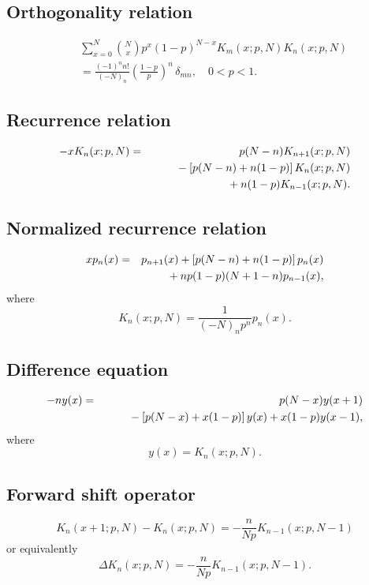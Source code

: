 \documentclass[envcountchap,graybox]{svmono}
\newcommand{\mathindent}{\hspace{7.5mm}}
\begin{document}
\subsection*{Orthogonality relation}
\begin{eqnarray}
\label{OrtKrawtchouk}
& &\sum_{x=0}^N\binom{N}{x}p^x(1-p)^{N-x} K_m(x;p,N)K_n(x;p,N)\nonumber\\
& &{}=\frac{(-1)^nn!}{(-N)_n}\left(\frac{1-p}{p}\right)^n\,\delta_{mn},\quad0 < p < 1.
\end{eqnarray}

\subsection*{Recurrence relation}
\begin{eqnarray}
\label{RecKrawtchouk}
-xK_n(x;p,N)&=&p(N-n)K_{n+1}(x;p,N)\nonumber\\
& &{}\mathindent{}-\left[p(N-n)+n(1-p)\right]K_n(x;p,N)\nonumber\\
& &{}\mathindent\mathindent{}+n(1-p)K_{n-1}(x;p,N).
\end{eqnarray}

\subsection*{Normalized recurrence relation}
\begin{eqnarray}
\label{NormRecKrawtchouk}
xp_n(x)&=&p_{n+1}(x)+\left[p(N-n)+n(1-p)\right]p_n(x)\nonumber\\
& &{}\mathindent{}+np(1-p)(N+1-n)p_{n-1}(x),
\end{eqnarray}
where
$$K_n(x;p,N)=\frac{1}{(-N)_np^n}p_n(x).$$

\subsection*{Difference equation}
\begin{eqnarray}
\label{dvKrawtchouk}
-ny(x)&=&p(N-x)y(x+1)\nonumber\\
& &{}\mathindent{}-\left[p(N-x)+x(1-p)\right]y(x)+x(1-p)y(x-1),
\end{eqnarray}
where
$$y(x)=K_n(x;p,N).$$

\subsection*{Forward shift operator}
\begin{equation}
\label{shift1KrawtchoukI}
K_n(x+1;p,N)-K_n(x;p,N)=-\frac{n}{Np}K_{n-1}(x;p,N-1)
\end{equation}
or equivalently
\begin{equation}
\label{shift1KrawtchoukII}
\Delta K_n(x;p,N)=-\frac{n}{Np}K_{n-1}(x;p,N-1).
\end{equation}
\end{document}
